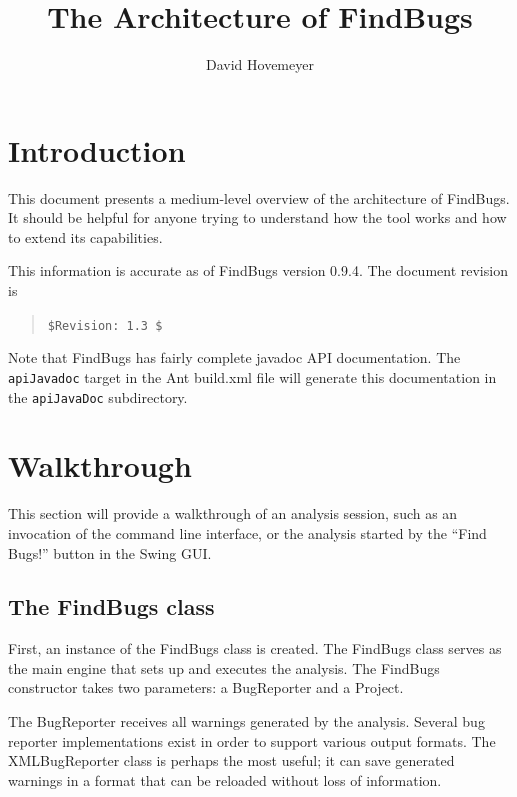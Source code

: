 \documentclass[11pt]{article}
\title{The Architecture of FindBugs}
\author{David Hovemeyer}
\date{}
\begin{document}
\maketitle
\tableofcontents

\section*{Introduction}

This document presents a medium-level overview of the architecture
of FindBugs.  It should be helpful for anyone trying to understand how
the tool works and how to extend its capabilities.

This information is accurate as of FindBugs version 0.9.4.
The document revision is
\begin{quote}
\verb+$Revision: 1.3 $+
\end{quote}

Note that FindBugs has fairly complete javadoc API documentation.
The {\tt apiJavadoc} target in the Ant build.xml file will generate
this documentation in the {\tt apiJavaDoc} subdirectory.

\section{Walkthrough}

This section will provide a walkthrough of an analysis session,
such as an invocation of the command line interface, or the analysis
started by the ``Find Bugs!'' button in the Swing GUI.

\subsection{The FindBugs class}


First, an instance of the FindBugs class is created.
The FindBugs class serves as the main engine that sets up and executes the
analysis.  The FindBugs constructor takes
two parameters: a BugReporter and a Project.

The BugReporter receives all warnings generated by the analysis.
Several bug reporter implementations exist in order to support various
output formats.  The XMLBugReporter class is perhaps the most useful;
it can save generated warnings in a format that can be reloaded without
loss of information.  
\end{document}
